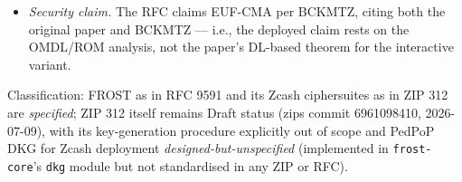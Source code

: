 \documentclass[11pt,a4paper]{article}
\theoremstyle{definition}
\begin{document}
\begin{itemize}
  FROST(ristretto255, SHA-512) (RECOMMENDED), FROST(Ed448, SHAKE256),
  FROST(P-256, SHA-256), and FROST(secp256k1, SHA-256); no Zcash suite
  appears in the standard itself. The two Zcash suites,
  FROST(Jubjub, BLAKE2b-512) and FROST(Pallas, BLAKE2b-512), are
  instead defined by ZIP 312, whose
  $H_2$ personalisation $\mathtt{Zcash\_RedPallasH}$ makes the FROST
  challenge equal RedDSA's $\mathsf{H}^{\circledast}$ --- the precise
  sense in which the standardised protocol plugs into the
  spend-authorisation verifier of the \emph{Ironwood Guide},
  \S``Authorisation of the spend: RedPallas''.
\item \emph{Security claim.} The RFC claims EUF-CMA per BCKMTZ, citing
  both the original paper and BCKMTZ --- i.e., the deployed claim rests
  on the OMDL/ROM analysis, not the paper's DL-based theorem for the
  interactive variant.
\end{itemize}

Classification: FROST as in RFC 9591 and its Zcash ciphersuites as in
ZIP 312 are \emph{specified}; ZIP 312 itself remains Draft status (zips
commit 6961098410, 2026-07-09), with its key-generation procedure
explicitly out of scope and PedPoP DKG for Zcash deployment
\emph{designed-but-unspecified} (implemented in \texttt{frost-core}'s
\texttt{dkg} module but not standardised in any ZIP or RFC).
\end{document}

